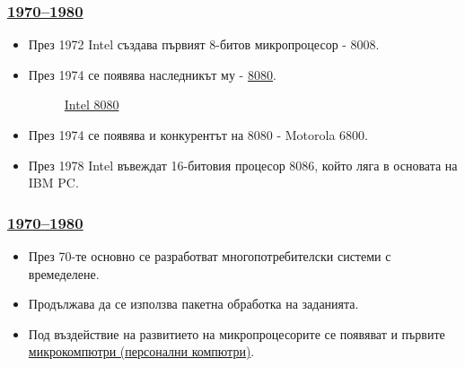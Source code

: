 \documentclass[ignorenonframetext, hyperref=unicode]{beamer}
\begin{document}
  
\begin{frame}
\frametitle{\href{http://en.wikipedia.org/wiki/History_of_computing_hardware_(1960s-present)}{
1970--1980}}
\begin{itemize}
  \item През 1972 Intel създава първият 8-битов микропроцесор - 8008.
  \item През 1974 се появява наследникът му -
  \href{http://en.wikipedia.org/wiki/Intel_8080}{8080}.
\begin{figure}
\center
{}
\caption{\href{http://en.wikipedia.org/wiki/Image:Intel_C8080A_9064_33001_N8384_top.jpg}{Intel
8080}}
\end{figure}
\end{itemize}
\begin{itemize}            
  \item През 1974 се появява и конкурентът на 8080 - Motorola 6800.
  \item През 1978 Intel въвеждат 16-битовия процесор 8086, който ляга в
  основата на IBM PC.
\end{itemize}
\end{frame}

\begin{frame}
\frametitle{\href{http://en.wikipedia.org/wiki/History_of_computing_hardware_(1960s-present)}{
1970--1980}}
\begin{itemize}
  \item През 70-те основно се разработват многопотребителски системи с
  времеделене.
  \item Продължава да се използва пакетна обработка на заданията.
  \item Под въздействие на развитието на микропроцесорите се появяват и първите
  \href{http://en.wikipedia.org/wiki/Microcomputer}{микрокомпютри (персонални компютри)}.
\end{itemize}
\end{frame}
\end{document}
